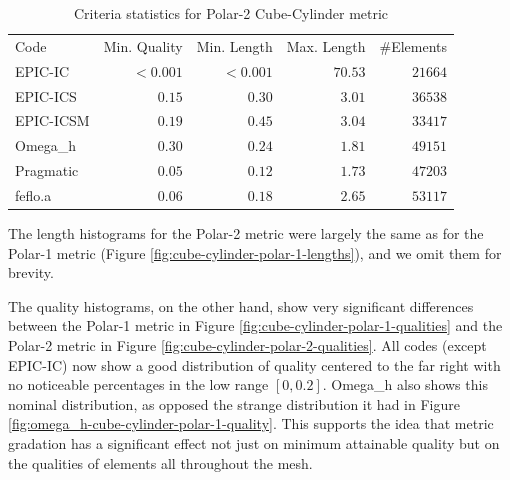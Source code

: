 \documentclass[3p,times,procedia,number]{elsarticle}
\begin{document}
\begin{table}
\caption{Criteria statistics for Polar-2 Cube-Cylinder metric}
\label{tab:polar-2-stats}
\begin{tabular}{lrrrr}
Code & Min. Quality & Min. Length & Max. Length & \#Elements\\
EPIC-IC    &$<0.001$&     $<0.001$&      $70.53$&    $21664$\\
EPIC-ICS   &$  0.15$&     $  0.30$&      $ 3.01$&    $36538$\\
EPIC-ICSM  &$  0.19$&     $  0.45$&      $ 3.04$&    $33417$\\
Omega\_h   &$  0.30$&     $  0.24$&      $ 1.81$&    $49151$\\
Pragmatic  &$  0.05$&     $  0.12$&      $ 1.73$&    $47203$\\
feflo.a    &$  0.06$&     $  0.18$&      $ 2.65$&    $53117$\\
\end{tabular}
\end{table}

The length histograms for the Polar-2 metric were largely the
same as for the Polar-1 metric
(Figure \ref{fig:cube-cylinder-polar-1-lengths}),
and we omit them for brevity.

The quality histograms, on the other hand, show very significant differences
between the Polar-1 metric in Figure \ref{fig:cube-cylinder-polar-1-qualities}
and the Polar-2 metric in Figure \ref{fig:cube-cylinder-polar-2-qualities}.
All codes (except EPIC-IC) now show a good distribution of quality centered to the
far right with no noticeable percentages in the low range $[0,0.2]$.
Omega\_h also shows this nominal distribution, as opposed the strange distribution
it had in Figure \ref{fig:omega_h-cube-cylinder-polar-1-quality}.
This supports the idea that metric gradation has a significant effect not just
on minimum attainable quality but on the qualities of elements all throughout the mesh.
\end{document}
